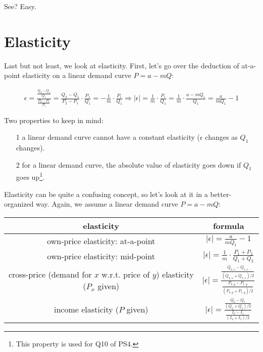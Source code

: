 \documentclass[twoside]{article}
\theoremstyle{definition}
\begin{document}
See? Easy.

\section{Elasticity}
Last but not least, we look at elasticity. First, let's go over the deduction of at-a-point elasticity on a linear demand curve $P=a-mQ$:

\begin{align*}
    \epsilon = \frac{\frac{Q_2-Q_1}{Q_1}}{\frac{P_2-P_1}{P_1}} = \frac{Q_2-Q_1}{P_2-P_1}\cdot\frac{P_1}{Q_1} = -\frac{1}{m}\cdot \frac{P_1}{Q_1} \Rightarrow \left\vert\epsilon\right\vert = \frac{1}{m}\cdot\frac{P_1}{Q_1} = \frac{1}{m}\cdot\frac{a-mQ_1}{Q_1} = \frac{a}{mQ_1}-1
\end{align*}

Two properties to keep in mind:
\begin{itemize}
    \item[1] a linear demand curve cannot have a constant elasticity ($\epsilon$ changes as $Q_1$ changes).
    \item[2] for a linear demand curve, the absolute value of elasticity goes down if $Q_1$ goes up\footnote{This property is used for Q10 of PS4.}.
\end{itemize}

Elasticity can be quite a confusing concept, so let's look at it in a better-organized way. Again, we assume a linear demand curve $P=a-mQ$:
\begin{table}[h!]
\centering
    \begin{tabular}{c|c}
         elasticity & formula \\
        \hline
        own-price elasticity: at-a-point & $\lvert\epsilon\rvert=\frac{a}{mQ_1}-1$ \\
        own-price elasticity: mid-point & $\lvert\epsilon \rvert = \frac{1}{m}\cdot\frac{P_1+P_2}{Q_1+Q_2}$ \\
        cross-price {\footnotesize(demand for $x$ w.r.t. price of $y$)} elasticity ($P_x$ given) & $\lvert\epsilon \rvert=\frac{\frac{Q_{2,x}-Q_{1,x}}{(Q_{2,x}+Q_{1,x})/2}}{\frac{P_{2,y}-P_{1,y}}{(P_{2,y}+P_{1,y})/2}}$\\
        income elasticity ($P$ given) & $\lvert\epsilon \rvert=\frac{\frac{Q_{2}-Q_{1}}{(Q_{2}+Q_{1})/2}}{\frac{I_{2}-I_{1}}{(I_{2}+I_{1})/2}}$
    \end{tabular}
\end{table}
\end{document}
